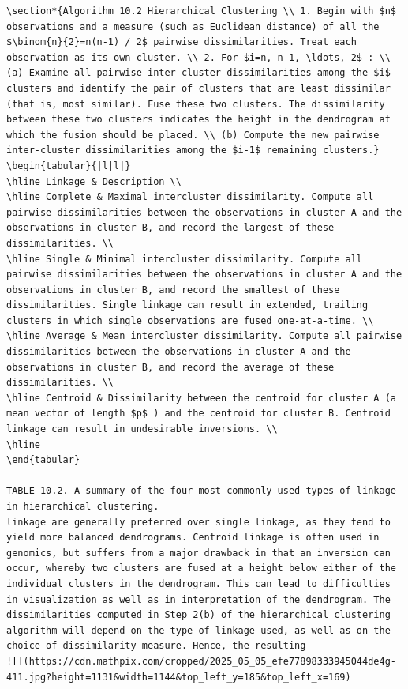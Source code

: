 \documentclass[10pt]{article}
\begin{document}
\begin{verbatim}
\section*{Algorithm 10.2 Hierarchical Clustering \\ 1. Begin with $n$ observations and a measure (such as Euclidean distance) of all the $\binom{n}{2}=n(n-1) / 2$ pairwise dissimilarities. Treat each observation as its own cluster. \\ 2. For $i=n, n-1, \ldots, 2$ : \\ (a) Examine all pairwise inter-cluster dissimilarities among the $i$ clusters and identify the pair of clusters that are least dissimilar (that is, most similar). Fuse these two clusters. The dissimilarity between these two clusters indicates the height in the dendrogram at which the fusion should be placed. \\ (b) Compute the new pairwise inter-cluster dissimilarities among the $i-1$ remaining clusters.}
\begin{tabular}{|l|l|}
\hline Linkage & Description \\
\hline Complete & Maximal intercluster dissimilarity. Compute all pairwise dissimilarities between the observations in cluster A and the observations in cluster B, and record the largest of these dissimilarities. \\
\hline Single & Minimal intercluster dissimilarity. Compute all pairwise dissimilarities between the observations in cluster A and the observations in cluster B, and record the smallest of these dissimilarities. Single linkage can result in extended, trailing clusters in which single observations are fused one-at-a-time. \\
\hline Average & Mean intercluster dissimilarity. Compute all pairwise dissimilarities between the observations in cluster A and the observations in cluster B, and record the average of these dissimilarities. \\
\hline Centroid & Dissimilarity between the centroid for cluster A (a mean vector of length $p$ ) and the centroid for cluster B. Centroid linkage can result in undesirable inversions. \\
\hline
\end{tabular}

TABLE 10.2. A summary of the four most commonly-used types of linkage in hierarchical clustering.
linkage are generally preferred over single linkage, as they tend to yield more balanced dendrograms. Centroid linkage is often used in genomics, but suffers from a major drawback in that an inversion can occur, whereby two clusters are fused at a height below either of the individual clusters in the dendrogram. This can lead to difficulties in visualization as well as in interpretation of the dendrogram. The dissimilarities computed in Step 2(b) of the hierarchical clustering algorithm will depend on the type of linkage used, as well as on the choice of dissimilarity measure. Hence, the resulting
![](https://cdn.mathpix.com/cropped/2025_05_05_efe77898333945044de4g-411.jpg?height=1131&width=1144&top_left_y=185&top_left_x=169)


\end{verbatim}
\end{document}
